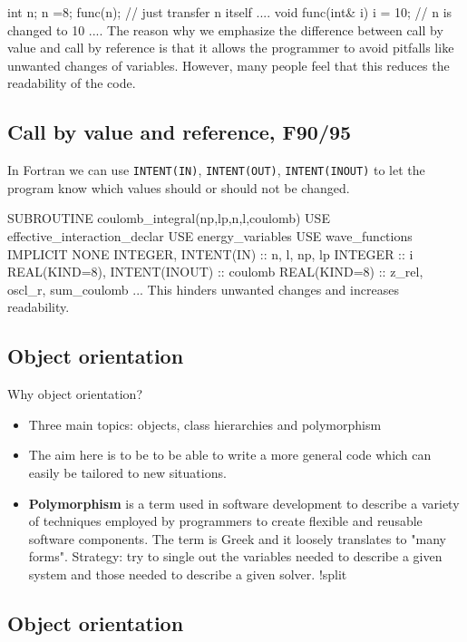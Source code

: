 \documentclass[%
oneside,                 %
final,                   %
10pt]{article}
\begin{document}
{{{{{{{{{{{\bcppcod
   int n; n =8;
   func(n); // just transfer n itself
   ....
   void func(int& i)
   {
     i = 10; // n is changed to 10
     ....
   }
\ecppcod
The reason why we emphasize the difference between call by value and call
by reference is that it allows the programmer to avoid pitfalls
like unwanted changes of variables. However, many people feel that this
reduces the readability of the code.


\subsection{Call by value and reference, F90/95}

In Fortran we can use \Verb!INTENT(IN)!, \Verb!INTENT(OUT)!, \Verb!INTENT(INOUT)! to let the
program know which values should or should not be changed.

\bfcod
SUBROUTINE coulomb_integral(np,lp,n,l,coulomb)
  USE effective_interaction_declar
  USE energy_variables
  USE wave_functions
  IMPLICIT NONE
  INTEGER, INTENT(IN)  :: n, l, np, lp
  INTEGER :: i
  REAL(KIND=8), INTENT(INOUT) :: coulomb
  REAL(KIND=8) :: z_rel, oscl_r, sum_coulomb
  ...
\efcod
This hinders unwanted changes and increases readability.



\subsection{Object orientation}

Why object orientation?

\begin{itemize}
  \item Three main topics: objects, class hierarchies and polymorphism

  \item The aim here is to be to be able to write a more general code which can easily be tailored to new situations.

  \item {\bf Polymorphism} is a term used in software development to describe a variety of techniques employed by programmers to create flexible and reusable software components. The term is Greek and it loosely translates to "many forms". Strategy: try to single out the variables needed to describe a given system and those needed to describe a given solver. !split
\end{itemize}

\noindent
\subsection{Object orientation}

}}}}}}}}}}}
\end{document}
